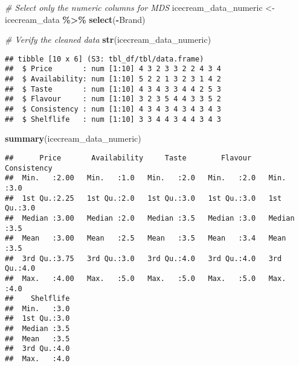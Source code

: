 \documentclass[
]{article}
\newenvironment{Shaded}{\begin{snugshade}}{\end{snugshade}}
\newcommand{\CommentTok}[1]{\textcolor[rgb]{0.56,0.35,0.01}{\textit{#1}}}
\newcommand{\FunctionTok}[1]{\textcolor[rgb]{0.13,0.29,0.53}{\textbf{#1}}}
\newcommand{\NormalTok}[1]{#1}
\newcommand{\OtherTok}[1]{\textcolor[rgb]{0.56,0.35,0.01}{#1}}
\newcommand{\SpecialCharTok}[1]{\textcolor[rgb]{0.81,0.36,0.00}{\textbf{#1}}}
\begin{document}
\begin{Shaded}
\begin{Highlighting}[]
\CommentTok{\# Select only the numeric columns for MDS}
\NormalTok{icecream\_data\_numeric }\OtherTok{\textless{}{-}}\NormalTok{ icecream\_data }\SpecialCharTok{\%\textgreater{}\%}
  \FunctionTok{select}\NormalTok{(}\SpecialCharTok{{-}}\NormalTok{Brand)}

\CommentTok{\# Verify the cleaned data}
\FunctionTok{str}\NormalTok{(icecream\_data\_numeric)}
\end{Highlighting}
\end{Shaded}

\begin{verbatim}
## tibble [10 x 6] (S3: tbl_df/tbl/data.frame)
##  $ Price       : num [1:10] 4 3 2 3 3 2 2 4 3 4
##  $ Availability: num [1:10] 5 2 2 1 3 2 3 1 4 2
##  $ Taste       : num [1:10] 4 3 4 3 3 4 4 2 5 3
##  $ Flavour     : num [1:10] 3 2 3 5 4 4 3 3 5 2
##  $ Consistency : num [1:10] 4 3 4 3 4 3 4 3 4 3
##  $ Shelflife   : num [1:10] 3 3 4 4 3 4 4 3 4 3
\end{verbatim}

\begin{Shaded}
\begin{Highlighting}[]
\FunctionTok{summary}\NormalTok{(icecream\_data\_numeric)}
\end{Highlighting}
\end{Shaded}

\begin{verbatim}
##      Price       Availability     Taste        Flavour     Consistency 
##  Min.   :2.00   Min.   :1.0   Min.   :2.0   Min.   :2.0   Min.   :3.0  
##  1st Qu.:2.25   1st Qu.:2.0   1st Qu.:3.0   1st Qu.:3.0   1st Qu.:3.0  
##  Median :3.00   Median :2.0   Median :3.5   Median :3.0   Median :3.5  
##  Mean   :3.00   Mean   :2.5   Mean   :3.5   Mean   :3.4   Mean   :3.5  
##  3rd Qu.:3.75   3rd Qu.:3.0   3rd Qu.:4.0   3rd Qu.:4.0   3rd Qu.:4.0  
##  Max.   :4.00   Max.   :5.0   Max.   :5.0   Max.   :5.0   Max.   :4.0  
##    Shelflife  
##  Min.   :3.0  
##  1st Qu.:3.0  
##  Median :3.5  
##  Mean   :3.5  
##  3rd Qu.:4.0  
##  Max.   :4.0
\end{verbatim}
\end{document}
